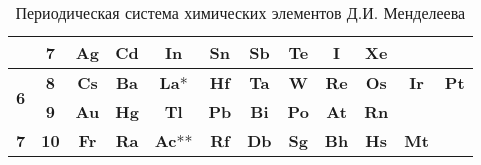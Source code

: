 \documentclass{article}
\begin{document}
\begin{table}[h!]
\begin{tabular}{|c|c|c|c|c|c|c|c|c|c|c|c|}
        \cline{2-12}
         & \textbf{7} & \cellcolor{alkaline_earth}\textbf{Ag} & \cellcolor{alkaline_earth}\textbf{Cd} & \cellcolor{post_transition}\textbf{In} & \cellcolor{post_transition}\textbf{Sn} & \cellcolor{post_transition}\textbf{Sb} & \cellcolor{post_transition}\textbf{Te} & \cellcolor{post_transition}\textbf{I} & \cellcolor{post_transition}\textbf{Xe} & & \\
        \hline
        \multirow{2}{*}{\textbf{6}} & \textbf{8} & \cellcolor{alkali}\textbf{Cs} & \cellcolor{alkali}\textbf{Ba} & \cellcolor{alkaline_earth}\textbf{La}* & \cellcolor{alkaline_earth}\textbf{Hf} & \cellcolor{alkaline_earth}\textbf{Ta} & \cellcolor{alkaline_earth}\textbf{W} & \cellcolor{alkaline_earth}\textbf{Re} & \cellcolor{alkaline_earth}\textbf{Os} & \cellcolor{alkaline_earth}\textbf{Ir} & \cellcolor{alkaline_earth}\textbf{Pt} \\
        \cline{2-12}
        & \textbf{9} & \cellcolor{alkaline_earth}\textbf{Au} & \cellcolor{alkaline_earth}\textbf{Hg} & \cellcolor{post_transition}\textbf{Tl} & \cellcolor{post_transition}\textbf{Pb} & \cellcolor{post_transition}\textbf{Bi} & \cellcolor{post_transition}\textbf{Po} & \cellcolor{post_transition}\textbf{At} & \cellcolor{post_transition}\textbf{Rn} & & \\
        \hline
        \textbf{7} & \textbf{10} & \cellcolor{alkali}\textbf{Fr} & \cellcolor{alkali}\textbf{Ra} & \cellcolor{alkaline_earth}\textbf{Ac}** & \cellcolor{alkaline_earth}\textbf{Rf} & \cellcolor{alkaline_earth}\textbf{Db} & \cellcolor{alkaline_earth}\textbf{Sg} & \cellcolor{alkaline_earth}\textbf{Bh} & \cellcolor{alkaline_earth}\textbf{Hs} & \cellcolor{alkaline_earth}\textbf{Mt} & \cellcolor{alkaline_earth} \\
        \hline
    \end{tabular}
    \caption{Периодическая система химических элементов Д.И. Менделеева}
\end{table}
\end{document}
